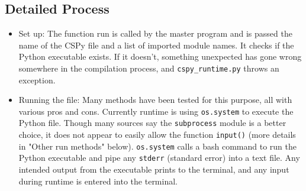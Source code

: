 \documentclass{article}
\begin{document}
\subsection{Detailed Process}
\begin{itemize}
\item Set up: The function run is called by the master program and is passed the name of the CSPy file and a list of imported module names. It checks if the Python executable exists. If it doesn't, something unexpected has gone wrong somewhere in the compilation process, and \verb|cspy_runtime.py| throws an exception.

\item Running the file: Many methods have been tested for this purpose, all with various pros and cons. Currently runtime is using \verb|os.system|  to execute the Python file. Though many sources say the \verb|subprocess| module is a better choice, it does not appear to easily allow the function \verb|input()| (more details in "Other run methods" below). \verb|os.system| calls a bash command to run the Python executable and pipe any \verb|stderr| (standard error) into a text file. Any intended output from the executable prints to the terminal, and any input during runtime is entered into the terminal.


\end{itemize}
\end{document}
